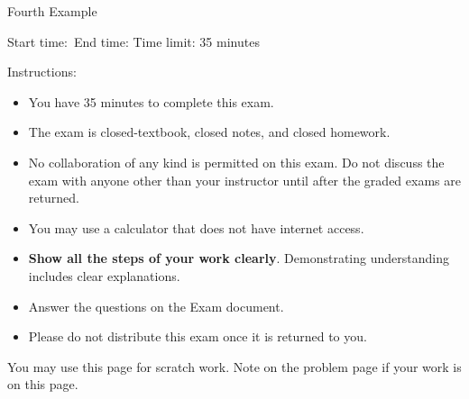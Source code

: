 \documentclass[main.tex,14pt]{subfiles}
\begin{document}
\setcounter{page}{0}
\thispagestyle{empty}

{\Large Fourth Example}%

{Start time:\hrulefill\ End time: \hrulefill}
Time limit: 35 minutes

\vspace{1cm}
{\Large Instructions:}
\begin{itemize}

 \item You have 35 minutes to complete this exam.

 \item The exam is closed-textbook, closed notes, and closed homework. 
 
 \item No collaboration of any kind is permitted on this exam. Do not discuss the exam with anyone other than your instructor until after the graded exams are returned.
 
 \item You may use a calculator that does not have internet access. 

 \item \textbf{Show all the steps of your work clearly}. Demonstrating understanding includes clear explanations.
 
\item Answer the questions on the Exam document. 


\item Please do not distribute this exam once it is returned to you.



 \end{itemize}


\afterpage{\blankpage}

\clearpage


 \begin{questions}


 \question 

 \question 

 \question 
 
 
\end{questions}

You may use this page for scratch work. Note on the problem page if your work is on this page.
\thispagestyle{empty}
\hbox{}


\checkoddpage{}
\end{document}
